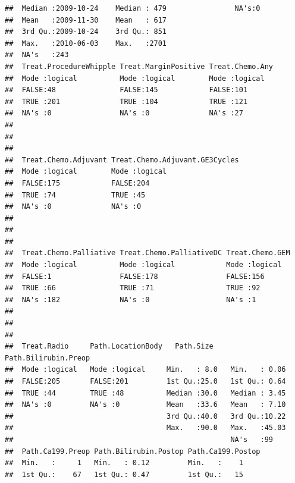 \documentclass{article}\usepackage[]{graphicx}\usepackage[]{color}
\makeatletter
\newenvironment{kframe}{%
 \def\at@end@of@kframe{}%
 \ifinner\ifhmode%
  \def\at@end@of@kframe{\end{minipage}}%
  \begin{minipage}{\columnwidth}%
 \fi\fi%
 \def\FrameCommand##1{\hskip\@totalleftmargin \hskip-\fboxsep
 \colorbox{shadecolor}{##1}\hskip-\fboxsep
     \hskip-\linewidth \hskip-\@totalleftmargin \hskip\columnwidth}%
 \MakeFramed {\advance\hsize-\width
   \@totalleftmargin\z@ \linewidth\hsize
   \@setminipage}}%
 {\par\unskip\endMakeFramed%
 \at@end@of@kframe}
\newenvironment{knitrout}{}{} %
\makeatother
\begin{document}
\begin{knitrout}
\begin{kframe}
\begin{verbatim}
##  Median :2009-10-24    Median : 479                NA's:0        
##  Mean   :2009-11-30    Mean   : 617                              
##  3rd Qu.:2009-10-24    3rd Qu.: 851                              
##  Max.   :2010-06-03    Max.   :2701                              
##  NA's   :243                                                     
##  Treat.ProcedureWhipple Treat.MarginPositive Treat.Chemo.Any
##  Mode :logical          Mode :logical        Mode :logical  
##  FALSE:48               FALSE:145            FALSE:101      
##  TRUE :201              TRUE :104            TRUE :121      
##  NA's :0                NA's :0              NA's :27       
##                                                             
##                                                             
##                                                             
##  Treat.Chemo.Adjuvant Treat.Chemo.Adjuvant.GE3Cycles
##  Mode :logical        Mode :logical                 
##  FALSE:175            FALSE:204                     
##  TRUE :74             TRUE :45                      
##  NA's :0              NA's :0                       
##                                                     
##                                                     
##                                                     
##  Treat.Chemo.Palliative Treat.Chemo.PalliativeDC Treat.Chemo.GEM
##  Mode :logical          Mode :logical            Mode :logical  
##  FALSE:1                FALSE:178                FALSE:156      
##  TRUE :66               TRUE :71                 TRUE :92       
##  NA's :182              NA's :0                  NA's :1        
##                                                                 
##                                                                 
##                                                                 
##  Treat.Radio     Path.LocationBody   Path.Size    Path.Bilirubin.Preop
##  Mode :logical   Mode :logical     Min.   : 8.0   Min.   : 0.06       
##  FALSE:205       FALSE:201         1st Qu.:25.0   1st Qu.: 0.64       
##  TRUE :44        TRUE :48          Median :30.0   Median : 3.45       
##  NA's :0         NA's :0           Mean   :33.6   Mean   : 7.10       
##                                    3rd Qu.:40.0   3rd Qu.:10.22       
##                                    Max.   :90.0   Max.   :45.03       
##                                                   NA's   :99          
##  Path.Ca199.Preop Path.Bilirubin.Postop Path.Ca199.Postop
##  Min.   :     1   Min.   : 0.12         Min.   :    1    
##  1st Qu.:    67   1st Qu.: 0.47         1st Qu.:   15    

\end{verbatim}
\end{kframe}
\end{knitrout}
\end{document}
